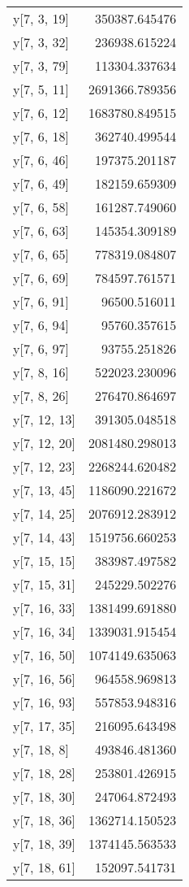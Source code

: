 \begin{longtable}{lr}
y[7, 3, 19] & 350387.645476 \\
y[7, 3, 32] & 236938.615224 \\
y[7, 3, 79] & 113304.337634 \\
y[7, 5, 11] & 2691366.789356 \\
y[7, 6, 12] & 1683780.849515 \\
y[7, 6, 18] & 362740.499544 \\
y[7, 6, 46] & 197375.201187 \\
y[7, 6, 49] & 182159.659309 \\
y[7, 6, 58] & 161287.749060 \\
y[7, 6, 63] & 145354.309189 \\
y[7, 6, 65] & 778319.084807 \\
y[7, 6, 69] & 784597.761571 \\
y[7, 6, 91] & 96500.516011 \\
y[7, 6, 94] & 95760.357615 \\
y[7, 6, 97] & 93755.251826 \\
y[7, 8, 16] & 522023.230096 \\
y[7, 8, 26] & 276470.864697 \\
y[7, 12, 13] & 391305.048518 \\
y[7, 12, 20] & 2081480.298013 \\
y[7, 12, 23] & 2268244.620482 \\
y[7, 13, 45] & 1186090.221672 \\
y[7, 14, 25] & 2076912.283912 \\
y[7, 14, 43] & 1519756.660253 \\
y[7, 15, 15] & 383987.497582 \\
y[7, 15, 31] & 245229.502276 \\
y[7, 16, 33] & 1381499.691880 \\
y[7, 16, 34] & 1339031.915454 \\
y[7, 16, 50] & 1074149.635063 \\
y[7, 16, 56] & 964558.969813 \\
y[7, 16, 93] & 557853.948316 \\
y[7, 17, 35] & 216095.643498 \\
y[7, 18, 8] & 493846.481360 \\
y[7, 18, 28] & 253801.426915 \\
y[7, 18, 30] & 247064.872493 \\
y[7, 18, 36] & 1362714.150523 \\
y[7, 18, 39] & 1374145.563533 \\
y[7, 18, 61] & 152097.541731 \\

\end{longtable}
